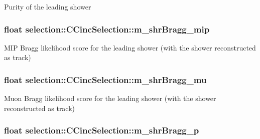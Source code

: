 Purity of the leading shower \hypertarget{classselection_1_1CCincSelection_a0d588b58345d52cc13a398bb3f6ff2fd}{
\subsubsection[{m\-\_\-shr\-Bragg\-\_\-mip}]{\setlength{\rightskip}{0pt plus 5cm}float selection\-::\-C\-Cinc\-Selection\-::m\-\_\-shr\-Bragg\-\_\-mip\hspace{0.3cm}{\ttfamily [private]}}}\label{classselection_1_1CCincSelection_a0d588b58345d52cc13a398bb3f6ff2fd}
M\-I\-P Bragg likelihood score for the leading shower (with the shower reconstructed as track) \hypertarget{classselection_1_1CCincSelection_abe0da2d66394a9583d9540f83a114901}{
\subsubsection[{m\-\_\-shr\-Bragg\-\_\-mu}]{\setlength{\rightskip}{0pt plus 5cm}float selection\-::\-C\-Cinc\-Selection\-::m\-\_\-shr\-Bragg\-\_\-mu\hspace{0.3cm}{\ttfamily [private]}}}\label{classselection_1_1CCincSelection_abe0da2d66394a9583d9540f83a114901}
Muon Bragg likelihood score for the leading shower (with the shower reconstructed as track) \hypertarget{classselection_1_1CCincSelection_a9c533f6915b180797d90b4ad789ffb39}{
\subsubsection[{m\-\_\-shr\-Bragg\-\_\-p}]{\setlength{\rightskip}{0pt plus 5cm}float selection\-::\-C\-Cinc\-Selection\-::m\-\_\-shr\-Bragg\-\_\-p\hspace{0.3cm}{\ttfamily [private]}}}\label{classselection_1_1CCincSelection_a9c533f6915b180797d90b4ad789ffb39}
